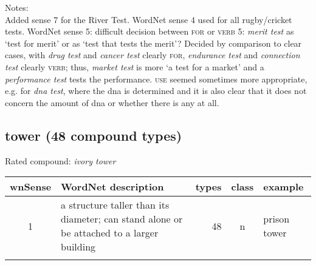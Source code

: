 \noindent
Notes:\\
Added sense 7 for the River Test. WordNet sense 4 used for all rugby/cricket tests.
WordNet sense 5: difficult decision between \textsc{for} or \textsc{verb} 5: \emph{merit test} as `test for merit'
or as `test that tests the merit'? Decided by comparison to clear cases, with \emph{drug test} and \emph{cancer test} clearly \textsc{for}, \emph{endurance test} and \emph{connection test} clearly \textsc{verb}; thus, \emph{market test}
is more `a test for a market' and a \emph{performance test} tests the
performance. \textsc{use} seemed sometimes more appropriate, e.g. for \emph{dna
test}, where the dna is determined and it is
also clear that it does not concern the amount of dna or whether
there is any at all.
\vspace*{-.3cm}

\subsection{tower     (48 compound types)}
Rated compound: \emph{ivory tower}
\vspace*{-.3cm}


\noindent
\begin{longtable}{c>{\raggedright\arraybackslash}p{5cm}rc>{\raggedright\arraybackslash}p{2cm}}\lsptoprule
{\small wnSense}&WordNet description&types&class&example\\\midrule
1&a structure taller than its diameter; can stand alone or be attached to a larger building&48&n&prison tower\\\lspbottomrule
\end{longtable}
\vspace*{-.3cm}

